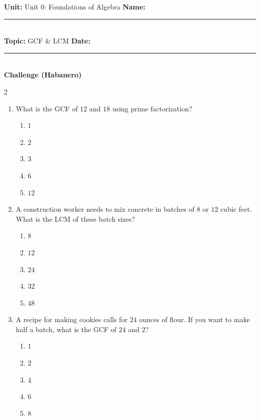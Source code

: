 \documentclass[10pt]{article}
\begin{document}
\enlargethispage{2.5cm}

\begin{tcolorbox}[colback=mainblue!5, colframe=mainblue, sharp corners, boxrule=0.5pt]
    \small \textbf{Unit:} Unit 0: Foundations of Algebra \hfill \textbf{Name:} \rule{3cm}{0.4pt} \\
    \small \textbf{Topic:} GCF & LCM \hfill \textbf{Date:} \rule{2cm}{0.4pt} \\
    \centering \textbf{\large Challenge (Habanero)}
\end{tcolorbox}

\vspace{0.2cm}

\begin{multicols}{2}
\begin{enumerate}[label=\textbf{Q\arabic*.}, leftmargin=*, itemsep=6pt, parsep=0pt]

  \item \small What is the GCF of $12$ and $18$ using prime factorization?
  \begin{enumerate}[label=(\Alph*), leftmargin=0.6cm, nosep, itemsep=2pt]
    \item $1$
    \item $2$
    \item $3$
    \item $6$
    \item $12$
  \end{enumerate}

  \item \small A construction worker needs to mix concrete in batches of $8$ or $12$ cubic feet. What is the LCM of these batch sizes?
  \begin{enumerate}[label=(\Alph*), leftmargin=0.6cm, nosep, itemsep=2pt]
    \item $8$
    \item $12$
    \item $24$
    \item $32$
    \item $48$
  \end{enumerate}

  \item \small A recipe for making cookies calls for $24$ ounces of flour. If you want to make half a batch, what is the GCF of $24$ and $2$?
  \begin{enumerate}[label=(\Alph*), leftmargin=0.6cm, nosep, itemsep=2pt]
    \item $1$
    \item $2$
    \item $4$
    \item $6$
    \item $8$
  \end{enumerate}


\end{enumerate}
\end{multicols}
\end{document}
